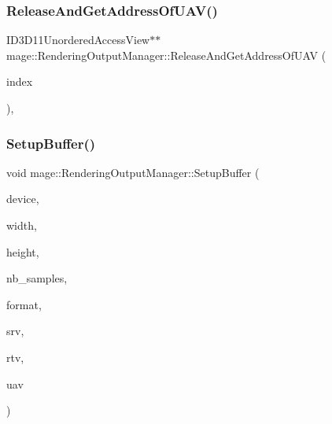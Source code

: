 \subsubsection{\texorpdfstring{Release\+And\+Get\+Address\+Of\+U\+A\+V()}{ReleaseAndGetAddressOfUAV()}}
{\footnotesize\ttfamily I\+D3\+D11\+Unordered\+Access\+View$\ast$$\ast$ mage\+::\+Rendering\+Output\+Manager\+::\+Release\+And\+Get\+Address\+Of\+U\+AV (\begin{DoxyParamCaption}\item[{\hyperlink{classmage_1_1_rendering_output_manager_a34cdd58dd0dda9d78878d79aa3393b89}{U\+A\+V\+Index}}]{index }\end{DoxyParamCaption})\hspace{0.3cm}{\ttfamily [private]}, {\ttfamily [noexcept]}}

\hypertarget{classmage_1_1_rendering_output_manager_a1a3df8b19e94b50d2a2a83bc8ebdcc97}{}\label{classmage_1_1_rendering_output_manager_a1a3df8b19e94b50d2a2a83bc8ebdcc97} 
\subsubsection{\texorpdfstring{Setup\+Buffer()}{SetupBuffer()}}
{\footnotesize\ttfamily void mage\+::\+Rendering\+Output\+Manager\+::\+Setup\+Buffer (\begin{DoxyParamCaption}\item[{I\+D3\+D11\+Device2 $\ast$}]{device,  }\item[{\hyperlink{namespacemage_a41c104c036fba3756a74e19f793eeaa1}{U32}}]{width,  }\item[{\hyperlink{namespacemage_a41c104c036fba3756a74e19f793eeaa1}{U32}}]{height,  }\item[{\hyperlink{namespacemage_a41c104c036fba3756a74e19f793eeaa1}{U32}}]{nb\+\_\+samples,  }\item[{D\+X\+G\+I\+\_\+\+F\+O\+R\+M\+AT}]{format,  }\item[{I\+D3\+D11\+Shader\+Resource\+View $\ast$$\ast$}]{srv,  }\item[{I\+D3\+D11\+Render\+Target\+View $\ast$$\ast$}]{rtv,  }\item[{I\+D3\+D11\+Unordered\+Access\+View $\ast$$\ast$}]{uav }\end{DoxyParamCaption})\hspace{0.3cm}{\ttfamily [private]}}

